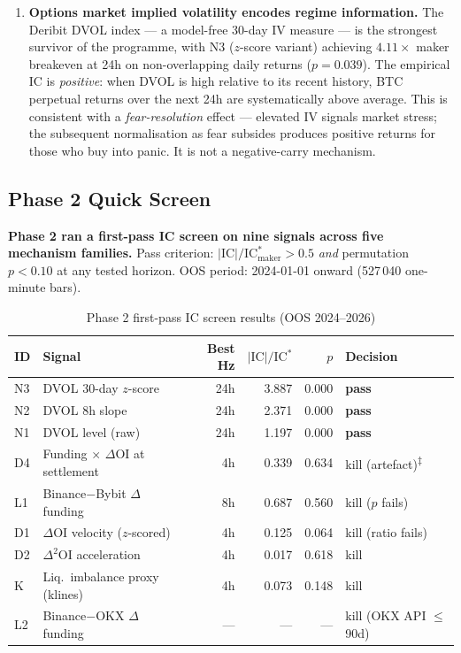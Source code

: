 \documentclass[12pt, a4paper]{article}
\theoremstyle{definition}
\newcommand{\IC}{\mathrm{IC}}
\begin{document}
\begin{enumerate}
  \item \textbf{Options market implied volatility encodes regime information.}
        The Deribit DVOL index --- a model-free 30-day IV measure --- is the
        strongest survivor of the programme, with N3 ($z$-score variant)
        achieving $4.11\times$ maker breakeven at 24h on non-overlapping daily
        returns ($p = 0.039$). The empirical IC is \emph{positive}: when DVOL
        is high relative to its recent history, BTC perpetual returns over the
        next 24h are systematically above average. This is consistent with a
        \emph{fear-resolution} effect --- elevated IV signals market stress;
        the subsequent normalisation as fear subsides produces positive returns
        for those who buy into panic. It is not a negative-carry mechanism.
\end{enumerate}

\subsection{Phase 2 Quick Screen}
\label{sec:phase2screen}

\textbf{Phase 2 ran a first-pass IC screen on nine signals across five mechanism
families.}  Pass criterion: $|\IC|/\IC^*_{\text{maker}} > 0.5$ \emph{and}
permutation $p < 0.10$ at any tested horizon.  OOS period: 2024-01-01 onward
(527\,040 one-minute bars).

\begin{table}[ht]
\centering
\caption{Phase 2 first-pass IC screen results (OOS 2024--2026)}
\label{tab:phase2screen}
\begin{tabular}{llrrrl}
\toprule
ID & Signal & Best Hz & $|\IC|/\IC^*$ & $p$ & Decision \\
\midrule
N3 & DVOL 30-day $z$-score                       & 24h & 3.887 & 0.000 & \textbf{pass} \\
N2 & DVOL 8h slope                               & 24h & 2.371 & 0.000 & \textbf{pass} \\
N1 & DVOL level (raw)                            & 24h & 1.197 & 0.000 & \textbf{pass} \\
\midrule
D4 & Funding $\times$ $\Delta$OI at settlement   & 4h  & 0.339 & 0.634 & kill (artefact)\textsuperscript{$\ddagger$} \\
L1 & Binance$-$Bybit $\Delta$funding             & 8h  & 0.687 & 0.560 & kill ($p$ fails) \\
D1 & $\Delta$OI velocity ($z$-scored)            & 4h  & 0.125 & 0.064 & kill (ratio fails) \\
D2 & $\Delta^2$OI acceleration                   & 4h  & 0.017 & 0.618 & kill \\
K  & Liq.\ imbalance proxy (klines)              & 4h  & 0.073 & 0.148 & kill \\
L2 & Binance$-$OKX $\Delta$funding               & ---  & ---   & ---   & kill (OKX API $\leq$90d) \\
\bottomrule
\end{tabular}
\end{table}
\end{document}
